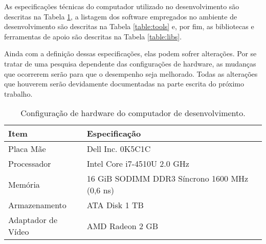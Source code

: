 As especificações técnicas do computador utilizado no desenvolvimento são descritas na Tabela \ref{table:config}, a listagem dos software empregados no ambiente de desenvolvimento são descritas na Tabela \ref{table:tools} e, por fim, as bibliotecas e ferramentas de apoio são descritas na Tabela \ref{table:libs}.

Ainda com a definição dessas especificações, elas podem sofrer alterações. Por se tratar de uma pesquisa dependente das configurações de hardware, as mudanças que ocorrerem serão para que o desempenho seja melhorado. Todas as alterações que houverem serão devidamente documentadas na parte escrita do próximo trabalho.

\begin{table}[!ht]
\centering
\begin{tabular}{ll}
\toprule
\textbf{Item}        & \textbf{Especificação}                        \\ \midrule
Placa Mãe            & Dell Inc. 0K5C1C                              \\ 
\rowcolor[gray]{0.9}
Processador          & Intel Core i7-4510U 2.0 GHz                   \\ 
Memória              & 16 GiB SODIMM DDR3 Síncrono 1600 MHz (0,6 ns) \\ 
\rowcolor[gray]{0.9}
Armazenamento        & ATA Disk 1 TB                                  \\ 
Adaptador de Vídeo   & AMD Radeon 2 GB                        \\ \bottomrule
\end{tabular}
\caption{Configuração de hardware do computador de desenvolvimento.}
\label{table:config}
\end{table}

